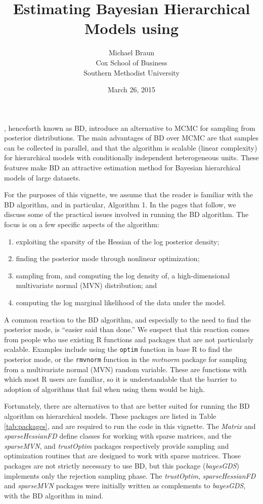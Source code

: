 \documentclass[10pt]{article}\usepackage[]{graphicx}\usepackage[]{color}
\title{Estimating Bayesian Hierarchical Models using \pkg{bayesGDS}}
\author{Michael Braun\\Cox School of Business\\Southern Methodist University}
\date{March 26, 2015}
\newcommand{\pkg}[1]{\emph{#1}}
\newcommand{\proglang}[1]{\textsf{#1}}
\newcommand{\func}[1]{\texttt{#1}}
\begin{document}
\maketitle




\citet{BraunDamien2015}, henceforth known as BD, introduce an
alternative to MCMC for sampling from posterior distributions. The
main advantages of BD over MCMC are
that samples can be collected in parallel, and that the algorithm
is scalable (linear complexity) for hierarchical models with conditionally independent
heterogeneous units.  These features make BD an attractive estimation method
for Bayesian hierarchical models of large datasets.

For the purposes of this vignette, we assume that the reader is familiar with
the BD algorithm, and in particular, Algorithm 1.  In the pages that
follow, we discuss some of the practical issues involved in running the BD
algorithm. The focus is on a few specific aspects of the algorithm:
\begin{enumerate}
\item exploiting the sparsity of the Hessian of the log
  posterior density;
\item finding the posterior mode through nonlinear optimization;
 \item sampling from, and computing the log density of, a
   high-dimensional multivariate normal (MVN) distribution; and
 \item computing the log marginal likelihood of the data under the model.
\end{enumerate}

A common reaction to the BD algorithm, and especially to the need to find
the posterior mode, is ``easier said than done.''  We suspect that this reaction comes
from people who use existing \proglang{R} functions and packages that
are not particularly scalable.  Examples include using the \func{optim}
function in base \proglang{R} to find the posterior mode, or the
\func{rmvnorm} function in the \pkg{mvtnorm} package for sampling from
a multivariate normal (MVN) random variable.  These are functions with which
most \proglang{R} users are familiar, so it is understandable that the
barrier to adoption of algorithms that fail when using them would be high.

Fortunately, there are alternatives to that are better
suited for running the BD algorithm on hierarchical models. These packages are listed in Table \ref{tab:packages}, and are
required to run the code in this vignette.  The \pkg{Matrix} and \pkg{sparseHessianFD} define
classes for working with sparse matrices, and the
\pkg{sparseMVN}, and \pkg{trustOptim} packages respectively provide sampling and
optimization routines that are designed to work with sparse matrices.
Those packages are not strictly necessary to use BD, but this package
(\pkg{bayesGDS}) implements only the rejection sampling phase.  The
\pkg{trustOptim}, \pkg{sparseHessianFD} and \pkg{sparseMVN} packages were
initially written as complements to \pkg{bayesGDS}, with the BD
algorithm in mind.
\end{document}
